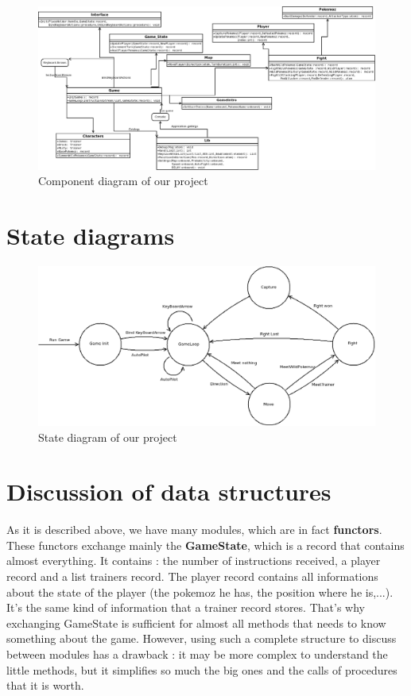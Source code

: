 \documentclass[10pt, a4paper]{article}
\begin{document}
\begin{landscape}

\begin{figure}

\includegraphics[width=\linewidth]{Diagramme1.png}
\caption{Component diagram of our project}
\end{figure}

\end{landscape}


\section{State diagrams}

\begin{figure}
 \includegraphics[width=\linewidth]{State_diagram_oz.png}
 \caption{State diagram of our project}
\end{figure}


\section{Discussion of data structures}

As it is described above, we have many \og{}modules\fg{}, which are in fact \textbf{functors}. These functors exchange mainly the \textbf{GameState}, which is a record that contains almost everything.
It contains : the number of instructions received, a player record and a list trainers record. The player record contains all informations about the state of the player (the pokemoz he has, the position where he is,...).
It's the same kind of information that a trainer record stores.
That's why exchanging GameState is sufficient for almost all methods that needs to know something about the game. However, using such a complete structure to discuss between modules has a drawback : it may be more complex to understand the \og{}little methods\fg{}, but it simplifies so much the big ones and the calls of procedures that it is worth.
\end{document}
